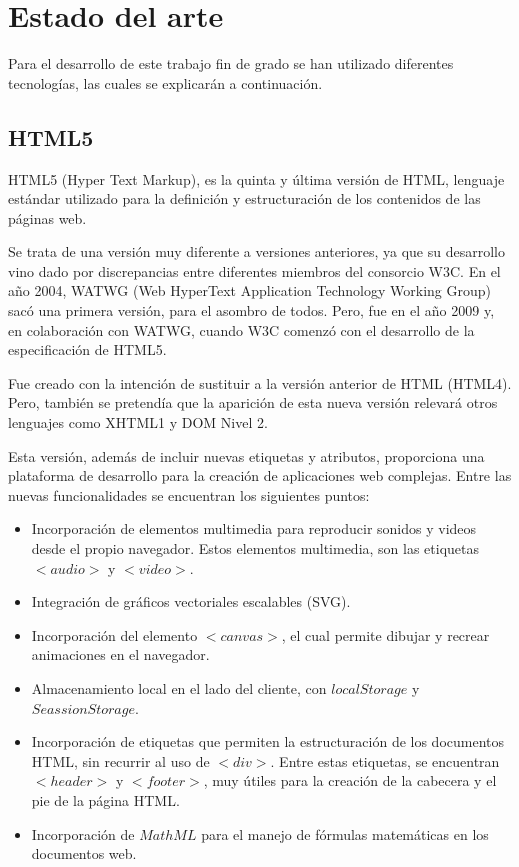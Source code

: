 \documentclass[a4paper, 12pt]{book}
\begin{document}
\cleardoublepage
\chapter{Estado del arte}
\label{chap:estado}


Para el desarrollo de este trabajo fin de grado se han utilizado diferentes tecnologías, las cuales se explicarán a continuación. 



\section{HTML5} 
\label{sec:HTML5}

HTML5 (Hyper Text Markup), es la quinta y última versión de HTML, lenguaje estándar utilizado para la definición y estructuración de los contenidos de las páginas web.

Se trata de una versión muy diferente a versiones anteriores, ya que su desarrollo vino dado por discrepancias entre diferentes miembros del consorcio W3C. En el año 2004, WATWG (Web HyperText Application Technology Working Group) sacó una primera versión, para el asombro de todos. Pero, fue en el año 2009 y, en colaboración con WATWG, cuando W3C comenzó con el desarrollo de la especificación de HTML5. 

Fue creado con la intención de sustituir a la versión anterior de HTML (HTML4). Pero, también se pretendía que la aparición de esta nueva versión relevará otros lenguajes como XHTML1 y DOM Nivel 2. 

Esta versión, además de incluir nuevas etiquetas y atributos, proporciona una plataforma de desarrollo para la creación de aplicaciones web complejas. Entre las nuevas funcionalidades se encuentran los siguientes puntos:   

\begin{itemize}
\item Incorporación de elementos multimedia para reproducir sonidos y videos desde el propio navegador. Estos elementos multimedia, son las etiquetas $<audio>$ y $<video>$.
\item Integración de gráficos vectoriales escalables (SVG).
\item Incorporación del elemento $<canvas>$, el cual permite dibujar y recrear animaciones en el navegador.
\item Almacenamiento local en el lado del cliente, con $localStorage$ y $SeassionStorage$.
\item Incorporación de etiquetas que permiten la estructuración de los documentos HTML, sin recurrir al uso de $<div>$. Entre estas etiquetas, se encuentran $<header>$ y $<footer>$, muy útiles para la creación de la cabecera y el pie de la página HTML.
\item Incorporación de $MathML$ para el manejo de fórmulas matemáticas en los documentos web.  


\end{itemize}
\end{document}
